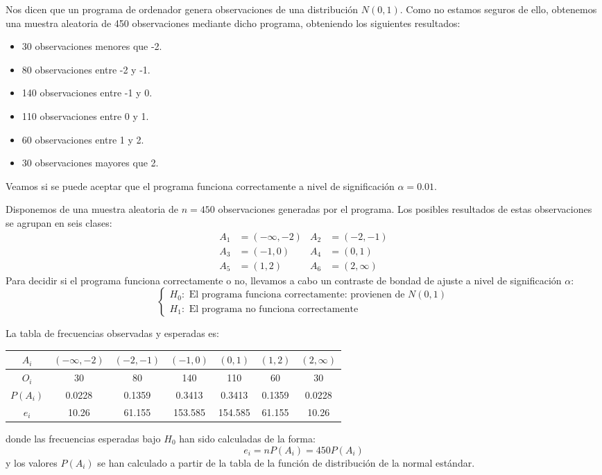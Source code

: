 \begin{example}
    Nos dicen que un programa de ordenador genera observaciones de una distribución $N(0, 1)$.
    Como no estamos seguros de ello, obtenemos una muestra aleatoria de 450 observaciones mediante dicho programa, obteniendo los siguientes resultados:
    \begin{itemize}
        \item 30 observaciones menores que -2.
        \item 80 observaciones entre -2 y -1.
        \item 140 observaciones entre -1 y 0.
        \item 110 observaciones entre 0 y 1.
        \item 60 observaciones entre 1 y 2.
        \item 30 observaciones mayores que 2.
    \end{itemize}
    Veamos si se puede aceptar que el programa funciona correctamente a nivel de significación $\alpha = 0.01$.

    Disponemos de una muestra aleatoria de $n = 450$ observaciones generadas por el programa.
    Los posibles resultados de estas observaciones se agrupan en seis clases:
    \begin{align*}
        A_1 & = (-\infty, -2) & A_2 & = (-2, -1)    \\
        A_3 & = (-1, 0)       & A_4 & = (0, 1)      \\
        A_5 & = (1, 2)        & A_6 & = (2, \infty)
    \end{align*}
    Para decidir si el programa funciona correctamente o no, llevamos a cabo un contraste de bondad de ajuste a nivel de significación $\alpha$:
    $$\begin{cases}
            H_0: \text{ El programa funciona correctamente: provienen de } N(0, 1) \\
            H_1: \text{ El programa no funciona correctamente}
        \end{cases}$$

    La tabla de frecuencias observadas y esperadas es:
    \begin{center}
        \begin{tabular}{| c | c c c c c c |}
            \hline
            $A_i$    & $(-\infty, -2)$ & $(-2, -1)$ & $(-1, 0)$ & $(0, 1)$ & $(1, 2)$ & $(2, \infty)$ \\
            \hline
            $O_i$    & 30              & 80         & 140       & 110      & 60       & 30            \\
            $P(A_i)$ & 0.0228          & 0.1359     & 0.3413    & 0.3413   & 0.1359   & 0.0228        \\
            $e_i$    & 10.26           & 61.155     & 153.585   & 154.585  & 61.155   & 10.26         \\
            \hline
        \end{tabular}
    \end{center}
    donde las frecuencias esperadas bajo $H_0$ han sido calculadas de la forma:
    $$e_i = nP(A_i) = 450P(A_i)$$
    y los valores $P(A_i)$ se han calculado a partir de la tabla de la función de distribución de la normal estándar.


\end{example}
